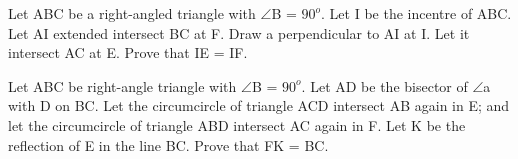 \item Let ABC be a right-angled triangle with $\angle$B = $90^{o}$. Let I be the incentre of ABC. Let AI extended intersect BC at F. Draw a perpendicular to AI at I. Let it intersect AC at E. Prove that IE = IF.

\item Let ABC be right-angle triangle with $\angle$B = $90^{o}$. Let AD be the bisector of $\angle$a with D on BC. Let the circumcircle of triangle ACD intersect AB again in E; and let the circumcircle of triangle ABD intersect AC again in F. Let K be the reflection of E in the line BC. Prove that FK = BC.

